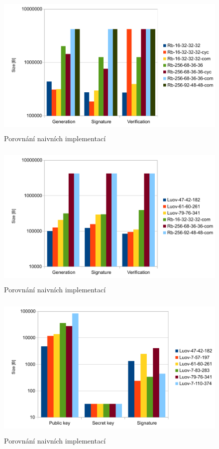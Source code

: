 \documentclass[thesis=M,english]{FITthesis}[2019/12/23]
\begin{document}
\begin{figure}[H]
\centering
\includegraphics[width=13cm,height=7cm]{images/mem-rb.pdf}
\caption{Porovnání naivních implementací}
\label{mem-rb}
\end{figure}

\begin{figure}[H]
\centering
\includegraphics[width=13cm,height=7cm]{images/mem-both.pdf}
\caption{Porovnání naivních implementací}
\label{mem-both}
\end{figure}

\begin{figure}[H]
\centering
\includegraphics[width=13cm,height=7cm]{images/sign-luov.pdf}
\caption{Porovnání naivních implementací}
\label{sign-luov}
\end{figure}
\end{document}
